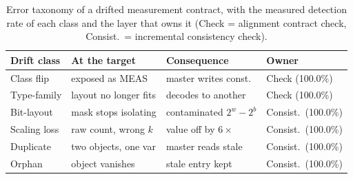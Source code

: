 \begin{table}[t]
\caption{Error taxonomy of a drifted measurement contract, with the measured detection rate of each class and the layer that owns it (Check = alignment contract check, Consist.\ = incremental consistency check).}
\label{tab:contract}
\centering
\scriptsize
\setlength{\tabcolsep}{2pt}
\begin{tabular}{>{\raggedright\arraybackslash}p{1.5cm}
                >{\raggedright\arraybackslash}p{2.2cm}
                >{\raggedright\arraybackslash}p{2.3cm}
                >{\raggedright\arraybackslash}p{1.55cm}}
\toprule
Drift class & At the target & Consequence & Owner \\
\midrule
Class flip & exposed as MEAS & master writes const. & Check (100.0\%) \\
Type-family & layout no longer fits & decodes to another & Check (100.0\%) \\
Bit-layout & mask stops isolating & contaminated $2^{w}-2^{b}$ & Consist.\ (100.0\%) \\
Scaling loss & raw count, wrong $k$ & value off by $6\times$ & Consist.\ (100.0\%) \\
Duplicate & two objects, one var & master reads stale & Consist.\ (100.0\%) \\
Orphan & object vanishes & stale entry kept & Consist.\ (100.0\%) \\
\bottomrule
\end{tabular}
\end{table}
